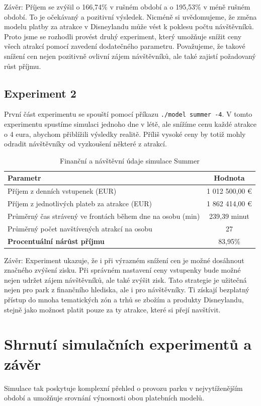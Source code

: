 \documentclass[a4paper,12pt]{article}
\begin{document}
Závěr: Příjem se zvýšil o 166,74\% v rušném období a o 195,53\%  v méně rušném období. To je očekávaný a pozitivní výsledek. Nicméně si uvědomujeme, že změna modelu platby za atrakce v Disneylandu může vést k poklesu počtu návštěvníků. Proto jsme se rozhodli provést druhý experiment, který umožňuje snížit ceny všech atrakcí pomocí zavedení dodatečného parametru. Považujeme, že takové snížení cen nejen pozitivně ovlivní zájem návštěvníků, ale také zajistí požadovaný růst příjmu.

\subsection{Experiment 2}
První část experimentu se spouští pomocí příkazu \texttt{./model summer -4}. V tomto experimentu spustíme simulaci jednoho dne v létě, ale snížíme cenu každé atrakce o 4 eura, abychom přiblížili výsledky realitě. Příliš vysoké ceny by totiž mohly odradit návštěvníky od vyzkoušení některé z atrakcí.

\begin{table}[h!]
	\centering
	\caption{Finanční a návštěvní údaje simulace Summer}
	\label{tab:financial_and_visit_data}
	\begin{tabular}{|l|c|}
		\hline
		\textbf{Parametr}                                         & \textbf{Hodnota} \\ \hline
		Příjem z denních vstupenek (EUR)                          & 1 012 500,00 €   \\ \hline
		Příjem z jednotlivých plateb za atrakce (EUR)             & 1 862 414,00 €   \\ \hline
		Průměrný čas strávený ve frontách během dne na osobu (min) & 239,39 minut     \\ \hline
		Průměrný počet navštívených atrakcí na osobu             & 27               \\ \hline
		\textbf{Procentuální nárůst příjmu}                       & 83,95\%         \\ \hline
	\end{tabular}
\end{table}

Závěr: Experiment ukazuje, že i při výrazném snížení cen je možné dosáhnout značného zvýšení zisku. Při správném nastavení ceny vstupenky bude možné nejen udržet zájem návštěvníků, ale také zvýšit zisk. Tato strategie je užitečná nejen pro park z finančního hlediska, ale i pro návštěvníky. Ti získají bezplatný přístup do mnoha tematických zón a trhů se zbožím a produkty Disneylandu, stejně jako možnost platit pouze za ty atrakce, které si přejí navštívit.

\section{Shrnutí simulačních experimentů a závěr}
Simulace tak poskytuje komplexní přehled o provozu parku v nejvytíženějším období a umožňuje srovnání výnosnosti obou platebních modelů.

 
\end{document}
